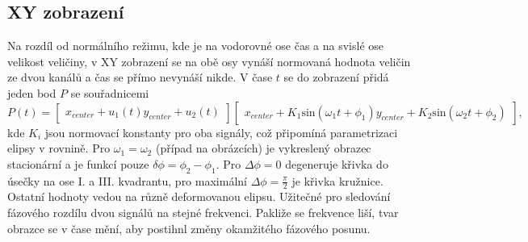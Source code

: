 \documentclass[twoside]{article}
\begin{document}
\subsection{XY zobrazení}
Na rozdíl od normálního režimu, kde je na vodorovné ose čas a na svislé ose velikost veličiny, v XY zobrazení
se na obě osy vynáší normovaná hodnota veličin ze dvou kanálů a čas se přímo nevynáší nikde. V čase $t$ se do zobrazení
přidá jeden bod $P$ se souřadnicemi 
\begin{equation*}
	P(t) = \begin{bmatrix}
		x_{center} + u_1(t)
		y_{center} + u_2(t)
	\end{bmatrix}
	\begin{bmatrix}
		x_{center} + K_1 \text{sin}(\omega_1t + \phi_1)
		y_{center} + K_2 \text{sin}(\omega_2t + \phi_2)
	\end{bmatrix},
\end{equation*}
kde $K_i$ jsou normovací konstanty pro oba signály, což připomíná parametrizaci elipsy v rovnině.
Pro $\omega_1 = \omega_2$ (případ na obrázcích) je vykreslený obrazec stacionární a je funkcí pouze $\delta \phi = \phi_2 - \phi_1$.
Pro $\Delta \phi = 0$ degeneruje křivka do úsečky na ose I. a III. kvadrantu, pro maximální $\Delta \phi = \frac{\pi}{2}$ je křivka kružnice.
Ostatní hodnoty vedou na různě deformovanou elipsu. Užitečné pro sledování fázového rozdílu dvou signálů na stejné frekvenci.
Pakliže se frekvence liší, tvar obrazce se v čase mění, aby postihnl změny okamžitého fázového posunu.
\end{document}
